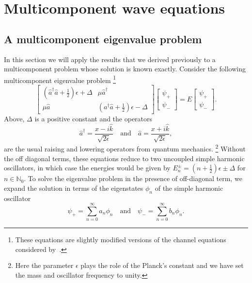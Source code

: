 \section{Multicomponent wave equations}

\subsection{A multicomponent eigenvalue problem}

In this section we will apply the results that we derived previously to a multicomponent problem whose solution is known exactly.
Consider the following multicomponent eigenvalue problem%
\footnote{These equations are slightly modified versions of the channel equations considered by~\citet{yabana1986}.}
%
\begin{equation}
  \begin{bmatrix}
    \left(\hat{a}^{\dagger}\hat{a} + \frac{1}{2}\right)\epsilon + \Delta & \mu\hat{a}^{\dagger}\\
    \mu\hat{a} & \left(a^{\dagger}\hat{a} + \frac{1}{2}\right)\epsilon - \Delta
  \end{bmatrix}
  \begin{bmatrix}
    \psi_{+}\\
    \psi_{-}
  \end{bmatrix}
  =
  E
  \begin{bmatrix}
    \psi_{+}\\
    \psi_{-}
  \end{bmatrix}.
\end{equation}
%
Above, $\Delta$ is a positive constant and the operators
%
\begin{equation}
\hat{a}^{\dagger} = \frac{x - i\hat{k}}{\sqrt{2\epsilon}}
  \quad\text{and}\quad
\hat{a} = \frac{x + i\hat{k}}{\sqrt{2\epsilon}},
\end{equation}
%
are the usual raising and lowering operators from quantum mechanics.%
\footnote{Here the parameter $\epsilon$ plays the role of the Planck's constant and we have set the mass and oscillator frequency to unity.}
Without the off diagonal terms, these equations reduce to two uncoupled simple harmonic oscillators, in which case the energies would be given by $E_{n}^{\pm} = (n + \frac{1}{2})\epsilon \pm \Delta$ for $n \in \mathbb{N}_{0}$.
To solve the eigenvalue problem in the presence of off-diagonal term, we expand the solution in terms of the eigenstates $\phi_{n}$ of the simple harmonic oscillator
%
\begin{equation}
  \psi_{+} = \sum_{n= 0}^{\infty} a_{n}\phi_{n}
  \quad\text{and}\quad
  \psi_{-} = \sum_{n = 0}^{\infty} b_{n}\phi_{n}.
\end{equation}
